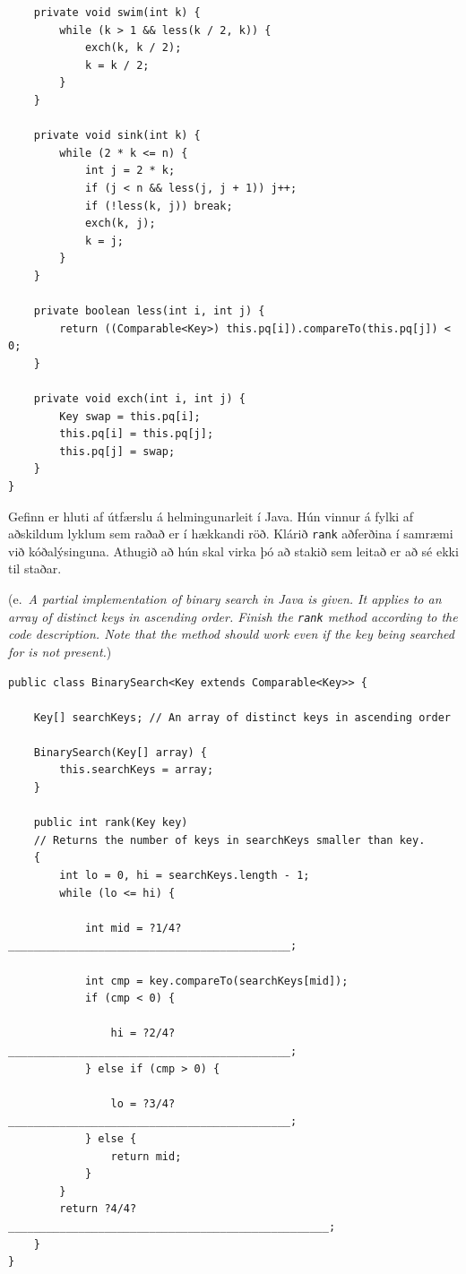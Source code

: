 \documentclass[addpoints]{exam}
\newcommand{\eng}[1]{(e.\ \emph{#1})}
\begin{document}
\begin{questions}
\begin{verbatim}
    private void swim(int k) {
        while (k > 1 && less(k / 2, k)) {
            exch(k, k / 2);
            k = k / 2;
        }
    }

    private void sink(int k) {
        while (2 * k <= n) {
            int j = 2 * k;
            if (j < n && less(j, j + 1)) j++;
            if (!less(k, j)) break;
            exch(k, j);
            k = j;
        }
    }

    private boolean less(int i, int j) {
        return ((Comparable<Key>) this.pq[i]).compareTo(this.pq[j]) < 0;
    }

    private void exch(int i, int j) {
        Key swap = this.pq[i];
        this.pq[i] = this.pq[j];
        this.pq[j] = swap;
    }
}
\end{verbatim}

	\question[4] Gefinn er hluti af útfærslu á helmingunarleit í Java. Hún vinnur á fylki af aðskildum lyklum sem raðað er í hækkandi röð. Klárið \texttt{rank} aðferðina í samræmi við kóðalýsinguna. Athugið að hún skal virka þó að stakið sem leitað er að sé ekki til staðar.

	\eng{A partial implementation of binary search in Java is given. It applies to an array of distinct keys in ascending order. Finish the \texttt{rank} method according to the code description. Note that the method should work even if the key being searched for is not present.}

	\begin{verbatim}
public class BinarySearch<Key extends Comparable<Key>> {

    Key[] searchKeys; // An array of distinct keys in ascending order

    BinarySearch(Key[] array) {
        this.searchKeys = array;
    }

    public int rank(Key key)
    // Returns the number of keys in searchKeys smaller than key.
    {
        int lo = 0, hi = searchKeys.length - 1;
        while (lo <= hi) {
        
            int mid = ?1/4?____________________________________________;

            int cmp = key.compareTo(searchKeys[mid]);
            if (cmp < 0) {
            
                hi = ?2/4?____________________________________________;
            } else if (cmp > 0) {
            
                lo = ?3/4?____________________________________________;
            } else {
                return mid;
            }
        }
        return ?4/4?__________________________________________________;
    }
}


\end{verbatim}
\end{questions}
\end{document}

